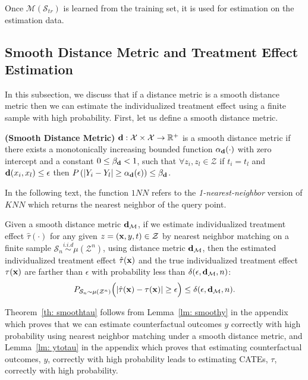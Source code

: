 Once $\mathcal{M}(\mathcal{S}_{tr})$ is learned from the training set, it is used for estimation on the estimation data.

\subsection{Smooth Distance Metric and Treatment Effect Estimation}
In this subsection, we discuss that if a distance metric is a smooth distance metric then we can estimate the individualized treatment effect using a finite sample with high probability. First, let us define a smooth distance metric.
\begin{define}
\textbf{(Smooth Distance Metric)} $\mathbf{d}:\mathcal{X}\times\mathcal{X}\to\mathbb{R}^{+}$ is a smooth distance metric if there exists a monotonically increasing bounded function $\alpha_{\mathbf{d}}(\cdot)$ with zero intercept and a constant $0 \leq \beta_{\mathbf{d}}<1$, such that $\forall z_i,z_l \in \mathcal{Z}$ if $t_i=t_l$ and $\mathbf{d}(x_i,x_l)\leq\epsilon$ then $P\left(|Y_i-Y_l|\geq\alpha_{\mathbf{d}}(\epsilon)\right)\leq\beta_{\mathbf{d}} $.
\end{define}
 
 In the following text, the function $1NN$ refers to the \textit{1-nearest-neighbor} version of $KNN$ which returns the nearest neighbor of the query point.

\begin{theorem}
\label{th: smoothtau}
Given a smooth distance metric $\mathbf{d}_{\mathcal{M}}$, if we estimate individualized treatment effect $\hat{\tau}(\cdot)$ for any given $z=(\mathbf{x},y,t) \in \mathcal{Z}$  by nearest neighbor matching on a finite sample $\mathcal{S}_n\overset{i.i.d}{\sim}\mu(\mathcal{Z}^n)$, using distance metric $\mathbf{d}_{\mathcal{M}}$, then the estimated individualized treatment effect $\hat{\tau}(\mathbf{x})$ and the true individualized treatment effect $\tau(\mathbf{x})$ are farther than $\epsilon$ with probability less than $\delta(\epsilon,\mathbf{d}_\mathcal{M},n)$:
$$ P_{\mathcal{S}_n \sim \mu(\mathcal{Z}^n)}\Big( |\hat{\tau}(\mathbf{x}) - \tau(\mathbf{x})| \geq \epsilon \Big) \leq \delta(\epsilon,\mathbf{d}_\mathcal{M},n). $$
\end{theorem}

 Theorem~\ref{th: smoothtau} follows from Lemma~\ref{lm: smoothy} in the appendix which proves that we can estimate counterfactual outcomes $y$ correctly with high probability using nearest neighbor matching under a smooth distance metric, and Lemma~\ref{lm: ytotau} in the appendix which proves that estimating counterfactual outcomes, $y$, correctly with high probability leads to estimating CATEs, $\tau$, correctly with high probability.
 



